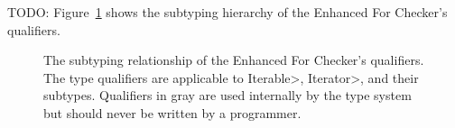 TODO:
Figure~\ref{fig-enhancedfor-hierarchy} shows the subtyping hierarchy of the
Enhanced For Checker's qualifiers.

\begin{figure}
\caption{The subtyping relationship of the Enhanced For Checker's qualifiers.
  The type qualifiers are applicable to \<Iterable>, \<Iterator>, and
  their subtypes.  Qualifiers in gray are used internally by the type
  system but should never be written by a programmer.}
\label{fig-enhancedfor-hierarchy}
\end{figure}



